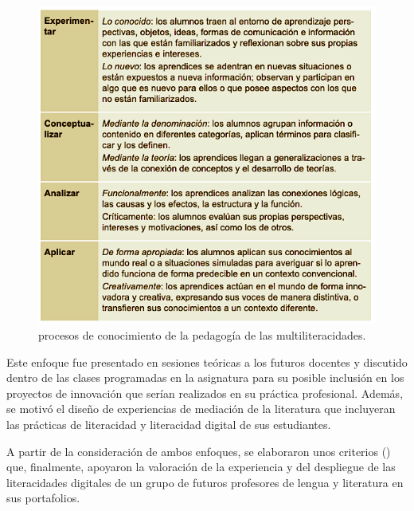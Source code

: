 \begin{figure}[htpb]
\centering
\begin{minipage}{\textwidth}
\caption{procesos de conocimiento de la pedagogía de las multiliteracidades.}
\label{fig-01}
\includegraphics[width=\textwidth]{fig1.png}
\end{minipage}
\end{figure}
	
Este enfoque fue presentado en sesiones teóricas a los futuros docentes
y discutido dentro de las clases programadas en la asignatura para su
posible inclusión en los proyectos de innovación que serían realizados
en su práctica profesional. Además, se motivó el diseño de experiencias
de mediación de la literatura que incluyeran las prácticas de
literacidad y literacidad digital de sus estudiantes.

A partir de la consideración de ambos enfoques, se elaboraron unos
criterios () que, finalmente, apoyaron la valoración de la
experiencia y del despliegue de las literacidades digitales de un grupo
de futuros profesores de lengua y literatura en sus portafolios.

